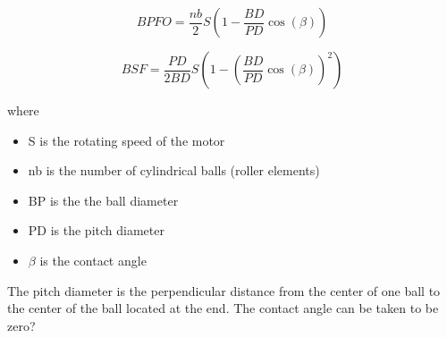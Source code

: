 \documentclass[../Main/thesis.tex]{subfiles}
\begin{document}
\begin{equation}\label{eq:bpfo}
BPFO = \frac{nb}{2}S\left( 1 -  \frac{BD}{PD}\cos(\beta)  \right)
\end{equation}

\begin{equation}\label{eq:bpfi}
BSF = \frac{PD}{2BD}S\left( 1 -  \left(\frac{BD}{PD}\cos(\beta)\right)^{2}  \right)
\end{equation}

where 
\begin{itemize}
\item S is the rotating speed of the motor
\item nb is the number of cylindrical balls (roller elements)
\item BP is the the ball diameter
\item PD is the pitch diameter
\item $\beta$ is the contact angle
\end{itemize}
The pitch diameter is the perpendicular distance from the center of one ball to the center of the ball located at the end. The contact angle can be taken to be zero?
\end{document}
